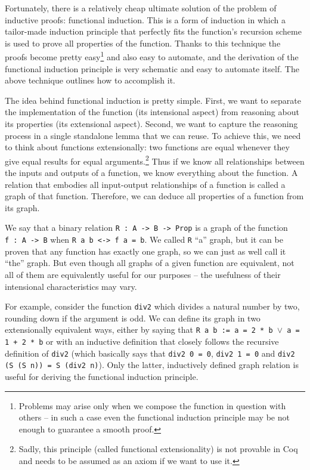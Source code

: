 \documentclass[declaration,mgr,english,shortabstract]{iithesis}
\newcommand{\m}[1]{\texttt{#1}}
\begin{document}
Fortunately, there is a relatively cheap ultimate solution of the problem of inductive proofs: functional induction. This is a form of induction in which a tailor-made induction principle that perfectly fits the function's recursion scheme is used to prove all properties of the function. Thanks to this technique the proofs become pretty easy\footnote{Problems may arise only when we compose the function in question with others -- in such a case even the functional induction principle may be not enough to guarantee a smooth proof.} and also easy to automate, and the derivation of the functional induction principle is very schematic and easy to automate itself. The above technique outlines how to accomplish it.

The idea behind functional induction is pretty simple. First, we want to separate the implementation of the function (its intensional aspect) from reasoning about its properties (its extensional aspect). Second, we want to capture the reasoning process in a single standalone lemma that we can reuse. To achieve this, we need to think about functions extensionally: two functions are equal whenever they give equal results for equal arguments.\footnote{Sadly, this principle (called functional extensionality) is not provable in Coq and needs to be assumed as an axiom if we want to use it.} Thus if we know all relationships between the inputs and outputs of a function, we know everything about the function. A relation that embodies all input-output relationships of a function is called a graph of that function. Therefore, we can deduce all properties of a function from its graph.

We say that a binary relation \m{R\ :\ A -> B -> Prop} is a graph of the function \m{f\ :\ A -> B} when \m{R a b <-> f a = b}. We called \m{R} ``a'' graph, but it can be proven that any function has exactly one graph, so we can just as well call it ``the'' graph. But even though all graphs of a given function are equivalent, not all of them are equivalently useful for our purposes -- the usefulness of their intensional characteristics may vary.

For example, consider the function \m{div2} which divides a natural number by two, rounding down if the argument is odd. We can define its graph in two extensionally equivalent ways, either by saying that \m{R a b := a = 2 * b $\lor$ a = 1 + 2 * b} or with an inductive definition that closely follows the recursive definition of \m{div2} (which basically says that \m{div2 0 = 0}, \m{div2 1 = 0} and \m{div2 (S (S n)) = S (div2 n)}). Only the latter, inductively defined graph relation is useful for deriving the functional induction principle.
\end{document}
